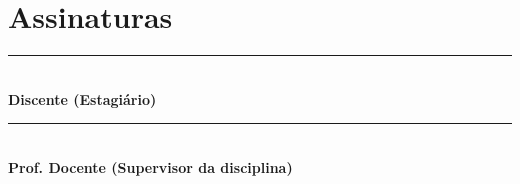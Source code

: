 \documentclass[12pt, a4paper]{article}
\begin{document}

\section{Assinaturas} \label{sec:assinaturas}
\vspace{1.5cm}

\noindent\rule{8cm}{0.4pt}\\
\textbf{Discente (Estagiário)}

\vspace{1.5cm}

\noindent\rule{8cm}{0.4pt}\\
\textbf{Prof. Docente (Supervisor da disciplina)}
\end{document}
